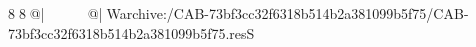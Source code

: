 8  8  @|                                                   @| W   archive:/CAB-73bf3cc32f6318b514b2a381099b5f75/CAB-73bf3cc32f6318b514b2a381099b5f75.resS 